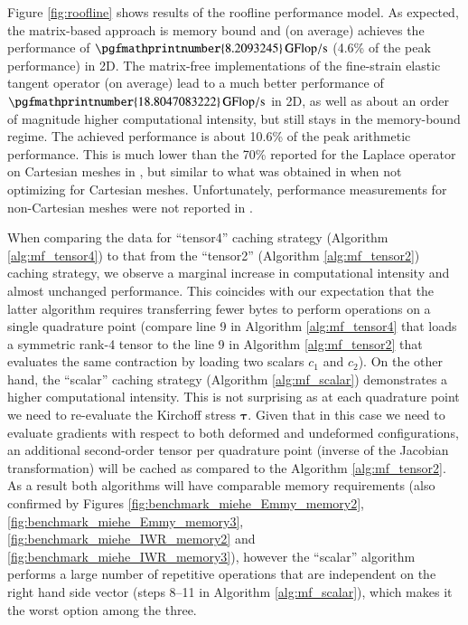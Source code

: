 \documentclass[times,doublespace]{nmeauth}
\def\gz  #1{           \mbox{$\boldsymbol{#1}$}}
\newcommand{\changeDD}[1]{#1}
\begin{document}
\changeDD{
Figure \ref{fig:roofline} shows results of the roofline performance model.
As expected, the matrix-based approach is memory bound and (on average) achieves the performance of $\pgfmathprintnumber{8.2093245}\,\rm{GFlop/s}$ (4.6\% of the peak performance) in 2D.
The matrix-free implementations of the fine-strain elastic tangent operator (on average) lead to a much better performance of
$\pgfmathprintnumber{18.8047083222}\,\rm{GFlop/s}$ in 2D, as well as about an order of magnitude higher computational intensity, but still stays in the memory-bound regime.
The achieved performance is about 10.6\% of the peak arithmetic performance. This is much lower than the
70\% reported for the Laplace operator on Cartesian meshes in \cite{kronbichler12}, but similar to what was obtained in \cite[Figure 14]{kronbichler2017fast} when not optimizing for Cartesian meshes.
Unfortunately, performance measurements for non-Cartesian meshes were not reported in \cite{kronbichler12}.
}

\changeDD{
When comparing the data for ``tensor4'' caching strategy (Algorithm \ref{alg:mf_tensor4}) to that from the ``tensor2'' (Algorithm \ref{alg:mf_tensor2}) caching strategy,
we observe a marginal increase in computational intensity and almost unchanged performance.
This coincides with our expectation that the latter algorithm requires transferring fewer bytes to perform operations on a single quadrature point
(compare line 9 in Algorithm \ref{alg:mf_tensor4} that loads a symmetric rank-4 tensor to the line 9 in Algorithm \ref{alg:mf_tensor2} that evaluates the
same contraction by loading two scalars $c_1$ and $c_2$).
On the other hand, the ``scalar'' caching strategy (Algorithm \ref{alg:mf_scalar}) demonstrates a higher computational intensity.
This is not surprising as at each quadrature point we need to re-evaluate the Kirchoff stress $\gz \tau$.
Given that in this case we need to evaluate gradients with respect to both deformed and undeformed configurations, an additional
second-order tensor per quadrature point (inverse of the Jacobian transformation) will be cached as compared to the Algorithm \ref{alg:mf_tensor2}.
As a result both algorithms will have comparable memory requirements (also confirmed by Figures \ref{fig:benchmark_miehe_Emmy_memory2}, \ref{fig:benchmark_miehe_Emmy_memory3}, \ref{fig:benchmark_miehe_IWR_memory2} and \ref{fig:benchmark_miehe_IWR_memory3}),
however the ``scalar'' algorithm performs a large number of repetitive operations that are
independent on the right hand side vector (steps 8--11 in Algorithm \ref{alg:mf_scalar}), which makes it the worst option among the three.
}
\end{document}
